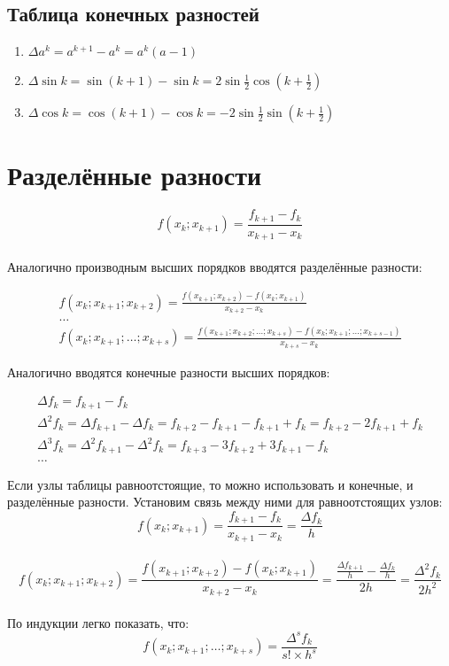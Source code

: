 \documentclass[a4paper,11pt]{article}
\begin{document}
  \subsection{Таблица конечных разностей}
  \begin{enumerate}
    \item \(\Delta a^k = a^{k+1} - a^k = a^k(a-1)\)
    \item \(\Delta \sin{k} = \sin{(k+1)} - \sin{k} = 2\sin{\frac{1}{2}}\cos{(k+\frac{1}{2})} \)
    \item \(\Delta \cos{k} = \cos{(k+1)} - \cos{k} = -2\sin{\frac{1}{2}}\sin{(k+\frac{1}{2})} \)
  \end{enumerate}
\newpage

\section{Разделённые разности}

\[f(x_k; x_{k+1}) = \frac{f_{k+1} - f_k}{x_{k+1} - x_k}\] \\

Аналогично производным высших порядков вводятся разделённые разности:

\begin{gather*}
  f(x_k; x_{k+1}; x_{k+2}) = \frac{f(x_{k+1}; x_{k+2}) - f(x_k; x_{k+1})}{x_{k+2} - x_k} \\
  \dots \\
  f(x_k; x_{k+1}; \dots; x_{k+s}) = \frac{f(x_{k+1}; x_{k+2}; \dots; x_{k+s})
      - f(x_k; x_{k+1}; \dots; x_{k+s-1})}{x_{k+s} - x_k}
\end{gather*}

Аналогично вводятся конечные разности высших порядков:

\begin{gather*}
  \Delta f_k = f_{k+1} - f_k \\
  \Delta^2 f_k = \Delta f_{k+1} - \Delta f_k = f_{k+2} - f_{k+1} - f_{k+1} + f_k = f_{k+2} - 2f_{k+1} + f_k \\
  \Delta^3 f_k = \Delta^2 f_{k+1} - \Delta^2 f_k = f_{k+3} - 3f_{k+2} + 3f_{k+1} - f_k \\
  \dots
\end{gather*}

Если узлы таблицы равноотстоящие, то можно использовать и конечные, и разделённые разности.
Установим связь между ними для равноотстоящих узлов: \\
\[f(x_k; x_{k+1}) = \frac{f_{k+1} - f_k}{x_{k+1} - x_k} = \frac{\Delta f_k}{h}\] \\
\[f(x_k; x_{k+1}; x_{k+2}) = \frac{f(x_{k+1}; x_{k+2}) - f(x_k; x_{k+1})}{x_{k+2} - x_k}
    = \frac{\frac{\Delta f_{k+1}}{h} - \frac{\Delta f_k}{h}}{2h} = \frac{\Delta^2 f_k}{2h^2}\] \\
По индукции легко показать, что: \\
\[f(x_k; x_{k+1}; \dots; x_{k+s}) = \frac{\Delta^s f_k}{s! \times h^s}\]
\newpage
\end{document}
